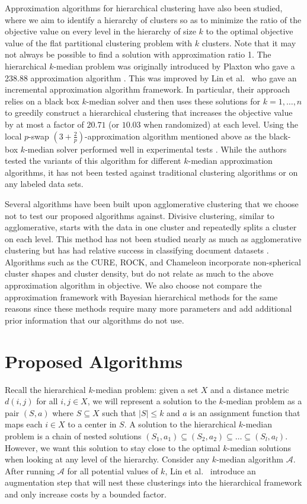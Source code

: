 \documentclass[conference, 10pt, final]{IEEEtran}
\begin{document}
Approximation algorithms for hierarchical clustering have also been studied, where we aim to identify a hierarchy of clusters so as to minimize the ratio of the objective value on every level in the hierarchy of size $k$ to the optimal objective value of the flat partitional clustering problem with $k$ clusters. Note that it may not always be possible to find a solution with approximation ratio 1. The hierarchical $k$-median problem was originally introduced by Plaxton who gave a 238.88 approximation algorithm \cite{Plaxton}. This was improved by Lin et al.~\cite{Lin} who gave an incremental approximation algorithm framework. In particular, their approach relies on a black box $k$-median solver and then uses these solutions for $k=1, \ldots, n$ to greedily construct a hierarchical clustering that increases the objective value by at most a factor of $20.71$ (or $10.03$ when randomized) at each level. Using the local $p$-swap $(3+\frac{2}{p})$-approximation algorithm mentioned above as the black-box $k$-median solver performed well in experimental tests \cite{Nagarajan}. While the authors tested the variants of this algorithm for different $k$-median approximation algorithms, it has not been tested against traditional clustering algorithms or on any labeled data sets. 

Several algorithms have been built upon agglomerative clustering that we choose not to test our proposed algorithms against. Divisive clustering, similar to agglomerative, starts with the data in one cluster and repeatedly splits a cluster on each level. This method has not been studied nearly as much as agglomerative clustering \cite{ESL} but has had relative success in classifying document datasets \cite{Zhao}.  Algorithms such as the CURE, ROCK, and Chameleon \cite{Guha_CURE, Guha_ROCK, Karypis} incorporate non-spherical cluster shapes and cluster density, but do not relate as much to the above approximation algorithm in objective. We also choose not compare the approximation framework with Bayesian hierarchical methods for the same reasons since these methods require many more parameters and add additional prior information that our algorithms do not use. 

\section{Proposed Algorithms}

Recall the hierarchical $k$-median problem: given a set $X$ and a distance metric $d(i,j)$ for all $i,j \in X$, we will represent a solution to the $k$-median problem as a pair $(S, a)$ where $S \subseteq X$ such that $|S| \leq k$ and $a$ is an assignment function that maps each $i \in X$ to a center in $S$.
 A solution to the hierarchical $k$-median problem is a chain of nested solutions $(S_1, a_1) \subseteq (S_2, a_2) \subseteq \ldots \subseteq (S_l, a_l)$. However, we want this solution to stay close to the optimal $k$-median solutions when looking at any level of the hierarchy.  
Consider any $k$-median algorithm $\mathcal{A}$. After running $\mathcal{A}$ for all potential values of $k$, Lin et al.~\cite{Lin} introduce an augmentation step that will nest these clusterings into the hierarchical framework and only increase costs by a bounded factor. 
\end{document}
